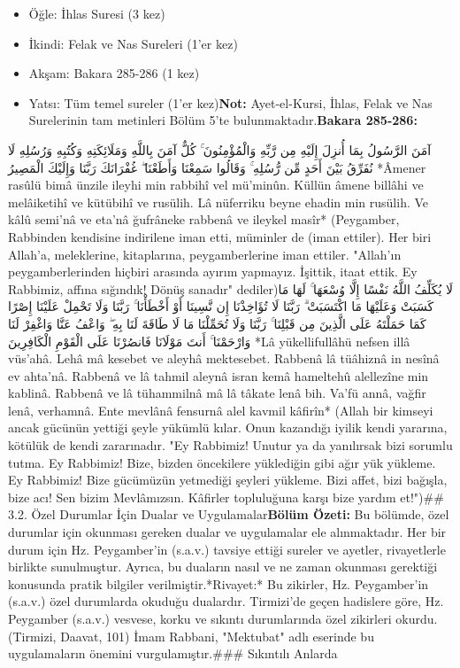 \documentclass[12pt,a4paper]{article}
\begin{document}
\begin{itemize}
\item Öğle: İhlas Suresi (3 kez)
\item İkindi: Felak ve Nas Sureleri (1'er kez)
\item Akşam: Bakara 285-286 (1 kez)
\item Yatsı: Tüm temel sureler (1'er kez)\textbf{Not:} Ayet-el-Kursi, İhlas, Felak ve Nas Surelerinin tam metinleri Bölüm 5'te bulunmaktadır.\textbf{Bakara 285-286:}
\end{itemize}
آمَنَ الرَّسُولُ بِمَا أُنزِلَ إِلَيْهِ مِن رَّبِّهِ وَالْمُؤْمِنُونَ ۚ كُلٌّ آمَنَ بِاللَّهِ وَمَلَائِكَتِهِ وَكُتُبِهِ وَرُسُلِهِ لَا نُفَرِّقُ بَيْنَ أَحَدٍ مِّن رُّسُلِهِ ۚ وَقَالُوا سَمِعْنَا وَأَطَعْنَا ۖ غُفْرَانَكَ رَبَّنَا وَإِلَيْكَ الْمَصِيرُ
*Âmener rasûlü bimâ ünzile ileyhi min rabbihî vel mü'minûn. Küllün âmene billâhi ve melâiketihî ve kütübihî ve rusülih. Lâ nüferriku beyne ehadin min rusülih. Ve kâlû semi'nâ ve eta'nâ ğufrâneke rabbenâ ve ileykel masîr*
(Peygamber, Rabbinden kendisine indirilene iman etti, müminler de (iman ettiler). Her biri Allah'a, meleklerine, kitaplarına, peygamberlerine iman ettiler. "Allah'ın peygamberlerinden hiçbiri arasında ayırım yapmayız. İşittik, itaat ettik. Ey Rabbimiz, affına sığındık! Dönüş sanadır" dediler)لَا يُكَلِّفُ اللَّهُ نَفْسًا إِلَّا وُسْعَهَا ۚ لَهَا مَا كَسَبَتْ وَعَلَيْهَا مَا اكْتَسَبَتْ ۗ رَبَّنَا لَا تُؤَاخِذْنَا إِن نَّسِينَا أَوْ أَخْطَأْنَا ۚ رَبَّنَا وَلَا تَحْمِلْ عَلَيْنَا إِصْرًا كَمَا حَمَلْتَهُ عَلَى الَّذِينَ مِن قَبْلِنَا ۚ رَبَّنَا وَلَا تُحَمِّلْنَا مَا لَا طَاقَةَ لَنَا بِهِ ۖ وَاعْفُ عَنَّا وَاغْفِرْ لَنَا وَارْحَمْنَا ۚ أَنتَ مَوْلَانَا فَانصُرْنَا عَلَى الْقَوْمِ الْكَافِرِينَ
*Lâ yükellifullâhü nefsen illâ vüs'ahâ. Lehâ mâ kesebet ve aleyhâ mektesebet. Rabbenâ lâ tüâhiznâ in nesînâ ev ahta'nâ. Rabbenâ ve lâ tahmil aleynâ isran kemâ hameltehû alellezîne min kablinâ. Rabbenâ ve lâ tühammilnâ mâ lâ tâkate lenâ bih. Va'fü annâ, vağfir lenâ, verhamnâ. Ente mevlânâ fensurnâ alel kavmil kâfirîn*
(Allah bir kimseyi ancak gücünün yettiği şeyle yükümlü kılar. Onun kazandığı iyilik kendi yararına, kötülük de kendi zararınadır. "Ey Rabbimiz! Unutur ya da yanılırsak bizi sorumlu tutma. Ey Rabbimiz! Bize, bizden öncekilere yüklediğin gibi ağır yük yükleme. Ey Rabbimiz! Bize gücümüzün yetmediği şeyleri yükleme. Bizi affet, bizi bağışla, bize acı! Sen bizim Mevlâmızsın. Kâfirler topluluğuna karşı bize yardım et!")\#\# 3.2. Özel Durumlar İçin Dualar ve Uygulamalar\textbf{Bölüm Özeti:}
Bu bölümde, özel durumlar için okunması gereken dualar ve uygulamalar ele alınmaktadır. Her bir durum için Hz. Peygamber'in (s.a.v.) tavsiye ettiği sureler ve ayetler, rivayetlerle birlikte sunulmuştur. Ayrıca, bu duaların nasıl ve ne zaman okunması gerektiği konusunda pratik bilgiler verilmiştir.*Rivayet:* Bu zikirler, Hz. Peygamber'in (s.a.v.) özel durumlarda okuduğu dualardır. Tirmizi'de geçen hadislere göre, Hz. Peygamber (s.a.v.) vesvese, korku ve sıkıntı durumlarında özel zikirleri okurdu. (Tirmizi, Daavat, 101) İmam Rabbani, "Mektubat" adlı eserinde bu uygulamaların önemini vurgulamıştır.\#\#\# Sıkıntılı Anlarda
\end{document}

